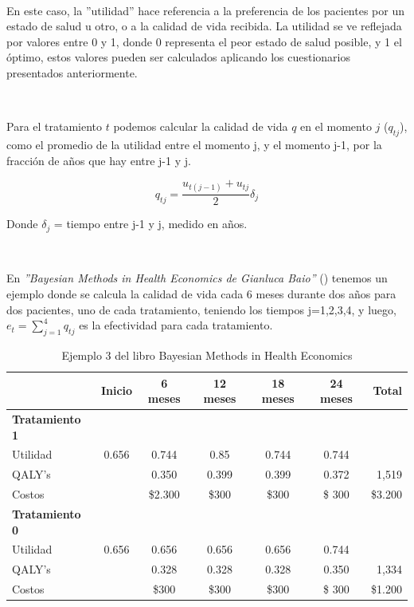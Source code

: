 \documentclass{siep}
\begin{document}
\

En este caso, la ''utilidad'' hace referencia a la preferencia de los pacientes por un estado de salud u otro, o a la calidad de vida recibida.
La utilidad se ve reflejada por valores entre 0 y 1, donde 0 representa el peor estado de salud posible, y 1 el óptimo, estos valores pueden ser calculados aplicando los cuestionarios presentados anteriormente.

\

Para el tratamiento $t$ podemos calcular la calidad de vida $q$ en el momento $j$ ($q_{tj}$), como el promedio de la utilidad entre el momento j, y el momento j-1, por la fracción de años que hay entre j-1 y j.

\begin{equation}
q_{tj} = \frac{u_{t(j-1)}+u_{tj}}{2}\delta_j
\end{equation}

Donde $\delta_j$ = tiempo entre j-1 y j, medido en años.

\

En \textit{''Bayesian Methods in Health Economics de Gianluca Baio''} (\cite{baio_bayesian_nodate}) tenemos un ejemplo donde se calcula la calidad de vida cada 6 meses durante dos años para dos pacientes, uno de cada tratamiento, teniendo los tiempos j=1,2,3,4, y luego, $e_t=\sum_{j=1}^4 q_{tj}$ es la efectividad para cada tratamiento.

\begin{table}[ht]
	\centering
	\begin{tabular}{lcccccr}
		\hline
		& Inicio & 6 meses & 12 meses & 18 meses & 24 meses & Total \\ 
		\hline
		\textbf{Tratamiento 1} \\
		Utilidad & 0.656 & 0.744 & 0.85 & 0.744 & 0.744 & \\ 
		QALY's &  & 0.350 & 0.399 & 0.399 & 0.372 & 1,519 \\
		Costos &  & \$2.300 & \$300 & \$300 & \$ 300 & \$3.200 \\
		\hline
		\textbf{Tratamiento 0} \\
		Utilidad & 0.656 & 0.656 & 0.656 & 0.656 & 0.744 & \\ 
		QALY's &  & 0.328 & 0.328 & 0.328 & 0.350 & 1,334 \\
		Costos &  & \$300 & \$300 & \$300 & \$ 300 & \$1.200 \\
		\hline
	\end{tabular}
	\caption{Ejemplo 3 del libro Bayesian Methods in Health Economics}
	\label{tabla:3}
\end{table}
\end{document}

